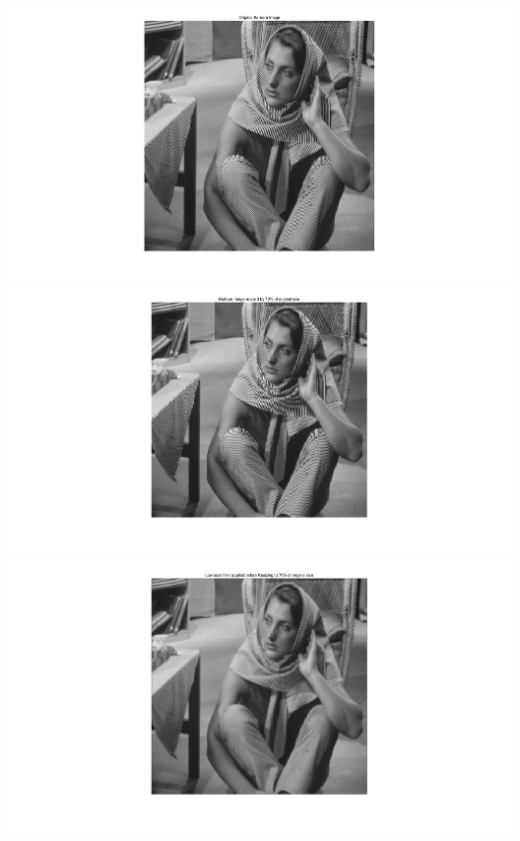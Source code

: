 \documentclass{article}
\begin{document}
\begin{enumerate}
\includegraphics[width=\textwidth]{ognobar.png}
\includegraphics[width=\textwidth]{0.7noLPF.png}
\includegraphics[width=\textwidth]{0.7LPF.png}

\end{enumerate}
\end{document}
